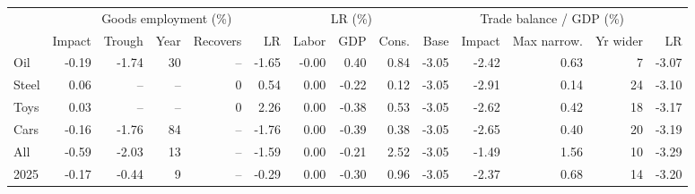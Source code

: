 \begin{tabular}{lrrrrrrrrrrrrr}
\toprule
 & \multicolumn{5}{c}{Goods employment (\%)} & \multicolumn{3}{c}{LR (\%)} & \multicolumn{5}{c}{Trade balance / GDP (\%)} \\
\cmidrule(lr){2-6}\cmidrule(lr){7-9}\cmidrule(lr){10-14}
 & Impact & Trough & Year & Recovers & LR & Labor & GDP & Cons. & Base & Impact & Max narrow. & Yr wider & LR \\
\midrule
Oil & -0.19 & -1.74 & 30 & -- & -1.65 & -0.00 & 0.40 & 0.84 & -3.05 & -2.42 & 0.63 & 7 & -3.07 \\
Steel & 0.06 & -- & -- & 0 & 0.54 & 0.00 & -0.22 & 0.12 & -3.05 & -2.91 & 0.14 & 24 & -3.10 \\
Toys & 0.03 & -- & -- & 0 & 2.26 & 0.00 & -0.38 & 0.53 & -3.05 & -2.62 & 0.42 & 18 & -3.17 \\
Cars & -0.16 & -1.76 & 84 & -- & -1.76 & 0.00 & -0.39 & 0.38 & -3.05 & -2.65 & 0.40 & 20 & -3.19 \\
All & -0.59 & -2.03 & 13 & -- & -1.59 & 0.00 & -0.21 & 2.52 & -3.05 & -1.49 & 1.56 & 10 & -3.29 \\
2025 & -0.17 & -0.44 & 9 & -- & -0.29 & 0.00 & -0.30 & 0.96 & -3.05 & -2.37 & 0.68 & 14 & -3.20 \\
\bottomrule
\end{tabular}
